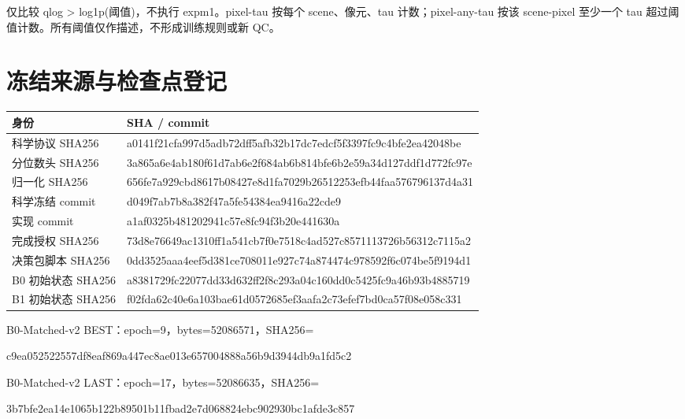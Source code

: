 \documentclass[UTF8,a4paper,11pt,fontset=windows]{ctexart}
\begin{document}
仅比较 qlog > log1p(阈值)，不执行 expm1。pixel-tau 按每个 scene、像元、tau 计数；pixel-any-tau 按该 scene-pixel 至少一个 tau 超过阈值计数。所有阈值仅作描述，不形成训练规则或新 QC。
\clearpage\section{冻结来源与检查点登记}
\begin{longtable}{p{36mm}p{116mm}}\toprule 身份 & SHA / commit\\\midrule\endhead
科学协议 SHA256 & {\footnotesize\ttfamily a0141f21cfa997d5adb72dff5afb32b17dc7edcf5f3397fc9c4bfe2ea42048be}\\
分位数头 SHA256 & {\footnotesize\ttfamily 3a865a6e4ab180f61d7ab6e2f684ab6b814bfe6b2e59a34d127ddf1d772fc97e}\\
归一化 SHA256 & {\footnotesize\ttfamily 656fe7a929cbd8617b08427e8d1fa7029b26512253efb44faa576796137d4a31}\\
科学冻结 commit & {\footnotesize\ttfamily d049f7ab7b8a382f47a5fe54384ea9416a22cde9}\\
实现 commit & {\footnotesize\ttfamily a1af0325b481202941c57e8fc94f3b20e441630a}\\
完成授权 SHA256 & {\footnotesize\ttfamily 73d8e76649ac1310ff1a541cb7f0e7518c4ad527c8571113726b56312c7115a2}\\
决策包脚本 SHA256 & {\footnotesize\ttfamily 0dd3525aaa4eef5d381ce708011e927c74a874474c978592f6c074be5f9194d1}\\
B0 初始状态 SHA256 & {\footnotesize\ttfamily a8381729fc22077dd33d632ff2f8c293a04c160dd0c5425fc9a46b93b4885719}\\
B1 初始状态 SHA256 & {\footnotesize\ttfamily f02fda62c40e6a103bae61d0572685ef3aafa2c73efef7bd0ca57f08e058c331}\\
\bottomrule\end{longtable}
B0-Matched-v2 BEST：epoch=9，bytes=52086571，SHA256=\par
{\footnotesize\ttfamily c9ea052522557df8eaf869a447ec8ae013e657004888a56b9d3944db9a1fd5c2}\par
{\footnotesize\raggedright{}\par}
B0-Matched-v2 LAST：epoch=17，bytes=52086635，SHA256=\par
{\footnotesize\ttfamily 3b7bfe2ea14e1065b122b89501b11fbad2e7d068824ebc902930bc1afde3c857}\par
\end{document}
